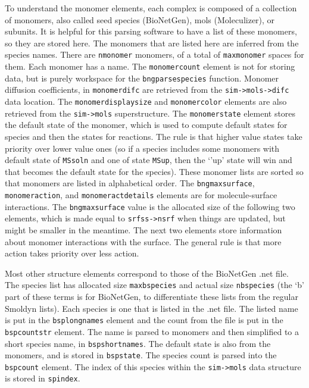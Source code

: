\documentclass {book}
\begin{document}
To understand the monomer elements, each complex is composed of a collection of monomers, also called seed species (BioNetGen), mols (Moleculizer), or subunits.  It is helpful for this parsing software to have a list of these monomers, so they are stored here.  The monomers that are listed here are inferred from the species names.  There are \texttt{nmonomer} monomers, of a total of \texttt{maxmonomer} spaces for them.  Each monomer has a name.  The \texttt{monomercount} element is not for storing data, but is purely workspace for the \texttt{bngparsespecies} function.  Monomer diffusion coefficients, in \texttt{monomerdifc} are retrieved from the \texttt{sim->mols->difc} data location.  The \texttt{monomerdisplaysize} and \texttt{monomercolor} elements are also retrieved from the \texttt{sim->mols} superstructure.  The \texttt{monomerstate} element stores the default state of the monomer, which is used to compute default states for species and then the states for reactions.  The rule is that higher value states take priority over lower value ones (so if a species includes some monomers with default state of \texttt{MSsoln} and one of state \texttt{MSup}, then the `'up' state will win and that becomes the default state for the species).  These monomer lists are sorted so that monomers are listed in alphabetical order.  The \texttt{bngmaxsurface}, \texttt{monomeraction}, and \texttt{monomeractdetails} elements are for molecule-surface interactions.  The \texttt{bngmaxsurface} value is the allocated size of the following two elements, which is made equal to \texttt{srfss->nsrf} when things are updated, but might be smaller in the meantime.  The next two elements store information about monomer interactions with the surface.  The general rule is that more action takes priority over less action.

Most other structure elements correspond to those of the BioNetGen .net file.  The species list has allocated size \texttt{maxbspecies} and actual size \texttt{nbspecies} (the `b' part of these terms is for BioNetGen, to differentiate these lists from the regular Smoldyn lists).  Each species is one that is listed in the .net file.  The listed name is put in the \texttt{bsplongnames} element and the count from the file is put in the \texttt{bspcountstr} element.  The name is parsed to monomers and then simplified to a short species name, in \texttt{bspshortnames}.  The default state is also from the monomers, and is stored in \texttt{bspstate}.  The species count is parsed into the \texttt{bspcount} element.  The index of this species within the \texttt{sim->mols} data structure is stored in \texttt{spindex}.
\end{document}
